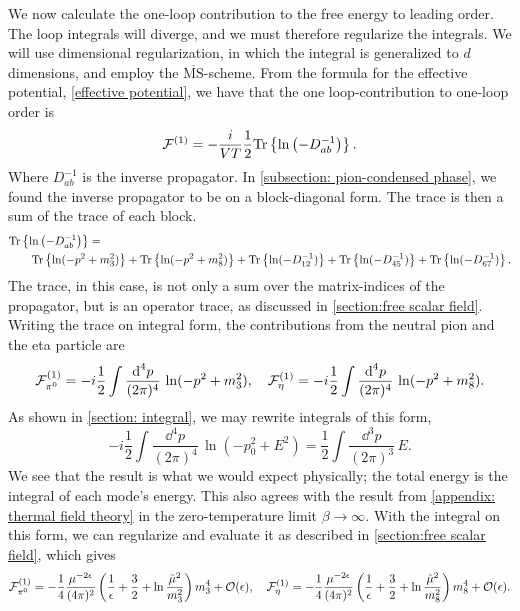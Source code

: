 We now calculate the one-loop contribution to the free energy to leading order.
The loop integrals will diverge, and we must therefore regularize the integrals.
We will use dimensional regularization, in which the integral is generalized to $d$ dimensions, and employ the $\overline{\mathrm{MS}}$-scheme.
From the formula for the effective potential, \autoref{effective potential}, we have that the one loop-contribution to one-loop order is 
%
\begin{equation}
    \mathcal{F}^{(1)}
    =
    - \frac{i}{V T} \frac{1}{2}
    \text{Tr} \left\{ \ln\left( - D_{ab}^{-1}\right) \right\}.
\end{equation}
%
Where $D_{ab}^{-1}$ is the inverse propagator.
In \autoref{subsection: pion-condensed phase}, we found the inverse propagator to be on a block-diagonal form.
The trace is then a sum of the trace of each block.
%
\begin{align}
    \nonumber
    &\text{Tr} \left\{ \ln\left( - D_{ab}^{-1}\right) \right\}
    =\\\nonumber
    &\quad\quad
    \text{Tr} \left\{ \ln(-p^2 + m_3^2) \right\}
    + \text{Tr} \left\{ \ln(-p^2 + m_8^2) \right\}
    + \text{Tr} \left\{ \ln(-D_{12}^{-1}) \right\}
    + \text{Tr} \left\{ \ln(-D_{45}^{-1}) \right\}
    + \text{Tr} \left\{ \ln(-D_{67}^{-1}) \right\}.
\end{align}
%
The trace, in this case, is not only a sum over the matrix-indices of the propagator, but is an operator trace, as discussed in \autoref{section:free scalar field}.
Writing the trace on integral form, the contributions from the neutral pion and the eta particle are
%
\begin{align}
    \mathcal{F}_{\pi^0}^{(1)}
    = -i\frac{1}{2} \int \frac{\text{d}^4 p}{(2\pi)^4}\, \ln(-p^2 + m_3^2), \quad
    \mathcal{F}_{\eta}^{(1)}
    = -i\frac{1}{2} \int \frac{\text{d}^4 p}{(2\pi)^4}\, \ln(-p^2 + m_8^2).
\end{align}
%
As shown in \autoref{section: integral}, we may rewrite integrals of this form,
%
\begin{equation}
    -i\frac{1}{2} \int \frac{\dd^4 p}{(2\pi)^4}\, \ln(-p_0^2 + E^2)
    = \frac{1}{2} \int  \frac{\dd^3 p}{(2\pi)^3 } \, E.
\end{equation}
%
We see that the result is what we would expect physically; the total energy is the integral of each mode's energy.
This also agrees with the result from \autoref{appendix: thermal field theory} in the zero-temperature limit $\beta \rightarrow \infty$.
With the integral on this form, we can regularize and evaluate it as described in  \autoref{section:free scalar field}, which gives
%
\begin{equation}
    \label{Free energy pi 0}
    \mathcal{F}^{(1)}_{\pi^0} 
    = 
    -  \frac{1}{4} \frac{ \mu^{-2 \epsilon}}{(4\pi)^2}
    \left( \frac{1}{\epsilon} + \frac{3}{2} + \ln \frac{\tilde \mu^2}{m_3^2} \right)
    m_3^4
    + \mathcal{O}(\epsilon), \quad
    \mathcal{F}^{(1)}_{\eta}
    = 
    - \frac{1}{4} \frac{\mu^{-2 \epsilon}}{(4\pi)^2} 
    \left( \frac{1}{\epsilon} + \frac{3}{2} + \ln \frac{\tilde \mu^2}{m_8^2} \right)
    m_8^4
    + \mathcal{O}(\epsilon).
\end{equation}

